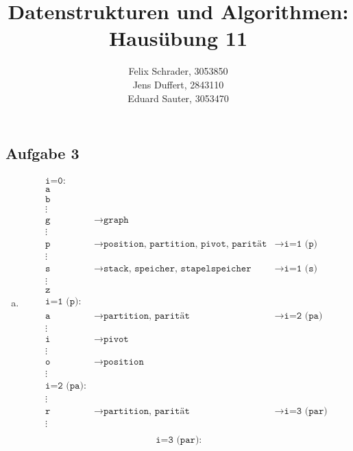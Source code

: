 \documentclass[11pt]{article}
\author{
  Felix Schrader, 3053850 \\ 
  Jens Duffert, 2843110 \\
  Eduard Sauter, 3053470
}
\title{Datenstrukturen und Algorithmen: Haus\"ubung 11}
\begin{document}
\maketitle
\subsection*{Aufgabe 3}
  \begin{enumerate}[a)]
    \item 
      \begin{align*}
        \texttt{i=0:} & & \\
        \texttt{a} & & \\ 
        \texttt{b} & & \\ 
        \vdots & & \\ 
        \texttt{g} & \rightarrow \texttt{graph} & \\ 
        \vdots & & \\ 
        \texttt{p} & \rightarrow \texttt{position, partition, pivot, parität}
          & \rightarrow \texttt{i=1 (p)} \\ 
        \vdots & & \\ 
        \texttt{s} & \rightarrow \texttt{stack, speicher, stapelspeicher}
          & \rightarrow \texttt{i=1 (s)} \\ 
        \vdots & & \\ 
        \texttt{z} & & \\ 
        \texttt{i=1 (p):} & & \\
        \texttt{a} & \rightarrow \texttt{partition, parität} & \rightarrow
          \texttt{i=2 (pa)} \\ 
        \vdots & & \\ 
        \texttt{i} & \rightarrow \texttt{pivot} & \\ 
        \vdots & & \\ 
        \texttt{o} & \rightarrow \texttt{position} & \\ 
        \vdots & & \\ 
        \texttt{i=2 (pa):} & & \\
        \vdots & & \\ 
        \texttt{r} & \rightarrow \texttt{partition, parität} & \rightarrow
          \texttt{i=3 (par)} \\ 
        \vdots & & \\ 
      \end{align*}
      \begin{align*}
        \texttt{i=3 (par):} & & \\

\end{align*}
\end{enumerate}
\end{document}
